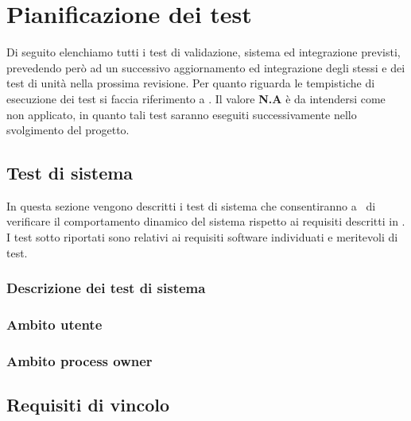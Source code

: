 \section{Pianificazione dei test}
Di seguito elenchiamo tutti i test di validazione, sistema ed integrazione previsti, prevedendo però ad un successivo aggiornamento ed integrazione degli stessi e dei test di unità nella prossima revisione. Per quanto riguarda le tempistiche di esecuzione dei test si faccia riferimento a \infoPDP.
Il valore \textbf{N.A} è da intendersi come non applicato, in quanto tali test saranno eseguiti successivamente nello svolgimento del progetto.
\subsection{Test di sistema}
In questa sezione vengono descritti i test di sistema che consentiranno a \gruppo ~di verificare il comportamento dinamico del sistema rispetto ai requisiti descritti in \infoAR. I test sotto riportati sono relativi ai requisiti software individuati e meritevoli di test.
\subsubsection{Descrizione dei test di sistema}
\subsubsection{Ambito utente}
\subsubsection{Ambito process owner}
\subsection{Requisiti di vincolo}
